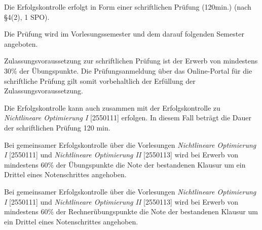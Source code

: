 \begin{course}

\setdoclanguagegerman
{}



\coursehead


\label{cour_7883.dp_997}


\begin{styleenv}
\begin{assessment}
Die Erfolgskontrolle erfolgt in Form einer schriftlichen Prüfung (120min.) (nach §4(2), 1 SPO).

 

Die Prüfung wird im Vorlesungssemester und dem darauf folgenden Semester angeboten.

 

Zulassungsvoraussetzung zur schriftlichen Prüfung ist der Erwerb von mindestens 30\% der Übungspunkte. Die Prüfungsanmeldung über das Online-Portal für die schriftliche Prüfung gilt somit vorbehaltlich der Erfüllung der Zulassungsvoraussetzung.

 

Die Erfolgskontrolle kann auch zusammen mit der Erfolgskontrolle zu \emph{Nichtlineare Optimierung I} [2550111] erfolgen. In diesem Fall beträgt die Dauer der schriftlichen Prüfung 120 min.

 

Bei gemeinsamer Erfolgskontrolle über die Vorlesungen \emph{Nichtlineare Optimierung I} [2550111] und \emph{Nichtlineare Optimierung II} [2550113] wird bei Erwerb von mindestens 60\% der Übungspunkte die Note der bestandenen Klausur um ein Drittel eines Notenschrittes angehoben.

 

Bei gemeinsamer Erfolgskontrolle über die Vorlesungen \emph{Nichtlineare Optimierung I} [2550111] und \emph{Nichtlineare Optimierung II} [2550113] wird bei Erwerb von mindestens 60\% der Rechnerübungspunkte die Note der bestandenen Klausur um ein Drittel eines Notenschrittes angehoben.



\end{assessment}
\end{styleenv}
\end{course}

